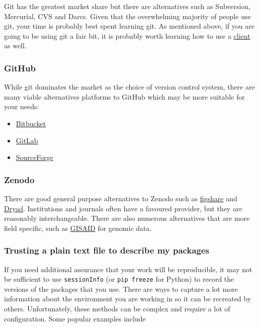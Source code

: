 \documentclass[11pt,onecolumn]{scrartcl}
\begin{document}
Git has the greatest market share but there are alternatives such as Subversion,
Mercurial, CVS and Darcs. Given that the overwhelming majority of people use
git, your time is probably best spent learning git. As mentioned above, if you
are going to be using git a fair bit, it is probably worth learning how to use a
\hyperref[sec:orga374b6c]{client} as well.

\subsubsection*{GitHub}
\label{sec:org4eb9376}

While git dominates the market as the choice of version control system, there
are many viable alternatives platforms to GitHub which may be more suitable for
your needs:

\begin{itemize}
\item \href{https://bitbucket.org/product/}{Bitbucket}
\item \href{https://about.gitlab.com/}{GitLab}
\item \href{https://sourceforge.net/}{SourceForge}
\end{itemize}

\subsubsection*{Zenodo}
\label{sec:org4a5a146}

There are good general purpose alternatives to Zenodo such as \href{https://figshare.com/}{figshare} and
\href{http://datadryad.org/}{Dryad}. Institutions and journals often have a favoured provider, but they are
reasonably interchangeable. There are also numerous alternatives that are more
field specific, such as \href{http://www.gisaid.org/}{GISAID} for genomic data.

\subsubsection*{Trusting a plain text file to describe my packages}
\label{sec:org2102da3}

If you need additional assurance that your work will be reproducible, it may not
be sufficient to use \texttt{sessionInfo} (or \texttt{pip freeze} for Python) to record the
versions of the packages that you use. There are ways to capture a lot more
information about the environment you are working in so it can be recreated by
others. Unfortunately, these methods can be complex and require a lot of
configuration. Some popular examples include
\end{document}

